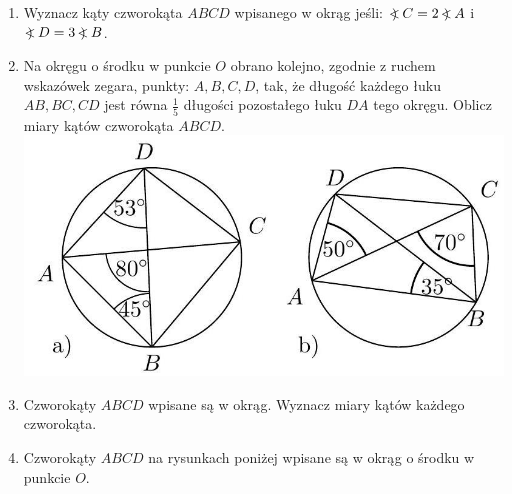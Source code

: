 \documentclass[10pt]{article}
\newcommand\Varangle{\mathop{{<\!\!\!\!\!\text{\small)}}\:}\nolimits}
\begin{document}
\begin{enumerate}
  \item Wyznacz kąty czworokąta \(A B C D\) wpisanego w okrąg jeśli: \(\Varangle C=2 \Varangle A\) i \(\Varangle D=3 \Varangle B\).
  \item Na okręgu o środku w punkcie \(O\) obrano kolejno, zgodnie z ruchem wskazówek zegara, punkty: \(A, B, C, D\), tak, że długość każdego łuku \(A B, B C, C D\) jest równa \(\frac{1}{5}\) długości pozostałego łuku \(D A\) tego okręgu. Oblicz miary kątów czworokąta \(A B C D\).\\
\includegraphics[max width=\textwidth, center]{2024_11_21_71f62bd117d375398909g-199}
  \item Czworokąty \(A B C D\) wpisane są w okrąg. Wyznacz miary kątów każdego czworokąta.
  \item Czworokąty \(A B C D\) na rysunkach poniżej wpisane są w okrąg o środku w punkcie \(O\).
\end{enumerate}
\end{document}
